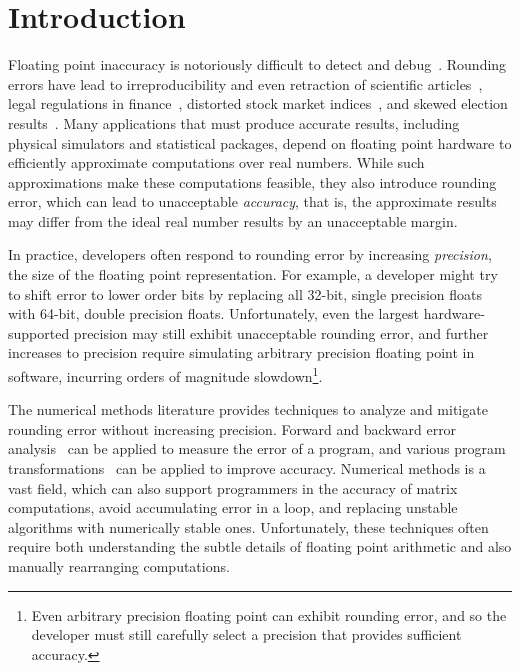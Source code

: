 \documentclass[paper.tex]{subfiles}
\begin{document}
\section{Introduction}
\label{sec:introduction}

Floating point inaccuracy is notoriously difficult to detect and
debug~\cite{berkeley00-needle-like, kahan-java-hurts}.  Rounding
errors have lead to irreproducibility and even retraction of
scientific articles~\cite{num-issues-in-stat, num-replication,
  stat-robustness}, legal regulations in finance~\cite{euro-rounding},
distorted stock market indices~\cite{distort-stock,
  wall-street-distort-stock}, and skewed election
results~\cite{round-elections}.  Many applications that must produce
accurate results, including physical simulators and statistical
packages, depend on floating point hardware to efficiently approximate
computations over real numbers.  While such approximations make these
computations feasible, they also introduce rounding error, which can
lead to unacceptable \textit{accuracy}, that is, the approximate
results may differ from the ideal real number results by an
unacceptable margin.


In practice, developers often respond to rounding error by increasing
\textit{precision}, the size of the floating point representation.
For example, a developer might try to shift error to lower order bits
by replacing all 32-bit, single precision floats with 64-bit, double
precision floats.  Unfortunately, even the largest hardware-supported
precision may still exhibit unacceptable rounding error, and further
increases to precision require simulating arbitrary precision floating
point in software, incurring orders of magnitude
slowdown\footnote{Even arbitrary precision floating point can exhibit
  rounding error, and so the developer must still carefully select a
  precision that provides sufficient accuracy.}.

The numerical methods literature provides techniques to analyze and
mitigate rounding error without increasing precision.  Forward and
backward error analysis~\cite{higham-book} can be applied to measure
the error of a program, and various program
transformations~\cite{book87-nmse} can be applied to improve accuracy.
Numerical methods is a vast field, which can also support programmers
in the accuracy of matrix computations, avoid accumulating error in a
loop, and replacing unstable algorithms with numerically stable ones.
Unfortunately, these techniques often require both understanding the
subtle details of floating point arithmetic and also manually
rearranging computations.
\end{document}
